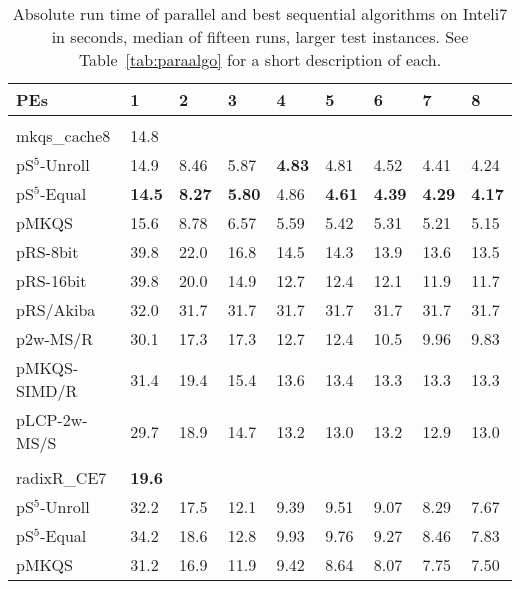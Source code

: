 \documentclass[a4paper]{myjournal}
\begin{document}
\begin{table}\centering\small
\caption{Absolute run time of parallel and best sequential algorithms on Inteli7 in seconds, median of fifteen runs, larger test instances. See Table~\ref{tab:paraalgo} for a short description of each.}\label{tab:absrun-Inteli7}
\begin{tabularx}{\linewidth}{l|*{8}{>{\hfill}X}|@{}}
PEs & 1   & 2 & 3 & 4 & 5 & 6 & 7 & 8 \\ \hline
& \multicolumn{8}{l|}{\textbf{URLs}, $n = 65.7\,\text{M}$, $N = 4\,\text{Gi}$, $\frac{D}{N} = 92.7\,\%$} \\ \cline{2-9}
mkqs\_cache8 & 14.8 &  &  &  &  &  &  &  \\
pS$^5$-Unroll &     14.9 &     8.46 &     5.87 & \bf 4.83 &     4.81 &     4.52 &     4.41 &     4.24 \\
 pS$^5$-Equal & \bf 14.5 & \bf 8.27 & \bf 5.80 &     4.86 & \bf 4.61 & \bf 4.39 & \bf 4.29 & \bf 4.17 \\
        pMKQS &     15.6 &     8.78 &     6.57 &     5.59 &     5.42 &     5.31 &     5.21 &     5.15 \\
     pRS-8bit &     39.8 &     22.0 &     16.8 &     14.5 &     14.3 &     13.9 &     13.6 &     13.5 \\
    pRS-16bit &     39.8 &     20.0 &     14.9 &     12.7 &     12.4 &     12.1 &     11.9 &     11.7 \\
    pRS/Akiba &     32.0 &     31.7 &     31.7 &     31.7 &     31.7 &     31.7 &     31.7 &     31.7 \\
     p2w-MS/R &     30.1 &     17.3 &     17.3 &     12.7 &     12.4 &     10.5 &     9.96 &     9.83 \\
 pMKQS-SIMD/R &     31.4 &     19.4 &     15.4 &     13.6 &     13.4 &     13.3 &     13.3 &     13.3 \\
 pLCP-2w-MS/S &     29.7 &     18.9 &     14.7 &     13.2 &     13.0 &     13.2 &     12.9 &     13.0 \\ \hline
& \multicolumn{8}{l|}{\textbf{Random}, $n = 205\,\text{M}$, $N = 2\,\text{Gi}$, $\frac{D}{N} = 42.1\,\%$} \\ \cline{2-9}
radixR\_CE7 & \bf 19.6 &  &  &  &  &  &  &  \\
pS$^5$-Unroll & 32.2 &     17.5 &     12.1 &     9.39 &     9.51 &     9.07 &     8.29 &     7.67 \\
 pS$^5$-Equal & 34.2 &     18.6 &     12.8 &     9.93 &     9.76 &     9.27 &     8.46 &     7.83 \\
        pMKQS & 31.2 &     16.9 &     11.9 &     9.42 &     8.64 &     8.07 &     7.75 &     7.50 \\

\end{tabularx}
\end{table}
\end{document}
